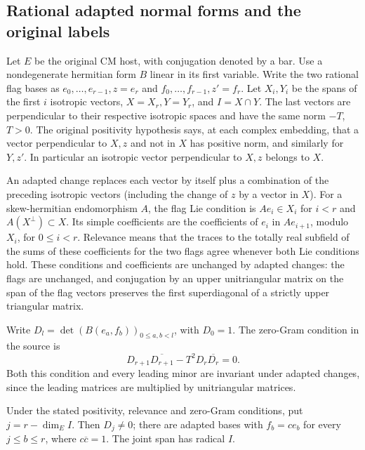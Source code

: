 \subsection{Rational adapted normal forms and the original labels}
\label{sec:flag-adapted-normal-form}

Let \(E\) be the original CM host, with conjugation denoted
by a bar. Use a nondegenerate hermitian form \(B\) linear
in its first variable. Write the two rational flag bases as
\(e_0,\ldots,e_{r-1},z=e_r\) and
\(f_0,\ldots,f_{r-1},z'=f_r\).
Let \(X_i,Y_i\) be the spans of the first \(i\) isotropic
vectors, \(X=X_r,Y=Y_r\), and \(I=X\cap Y\).
The last vectors are perpendicular to their respective
isotropic spaces and have the same norm \(-T\), \(T>0\).
The original positivity hypothesis says, at each complex
embedding, that a vector perpendicular to \(X,z\) and not
in \(X\) has positive norm, and similarly for \(Y,z'\).
In particular an isotropic vector perpendicular to \(X,z\)
belongs to \(X\).

An adapted change replaces each vector by itself plus a
combination of the preceding isotropic vectors (including
the change of \(z\) by a vector in \(X\)).
For a skew-hermitian endomorphism \(A\), the flag Lie
condition is \(Ae_i\in X_i\) for \(i<r\) and
\(A(X^\perp)\subset X\). Its simple coefficients are the
coefficients of \(e_i\) in \(Ae_{i+1}\), modulo \(X_i\),
for \(0\le i<r\). Relevance means that the traces to the
totally real subfield of the sums of these coefficients
for the two flags agree whenever both Lie conditions hold.
These conditions and coefficients are unchanged by adapted
changes: the flags are unchanged, and conjugation by an
upper unitriangular matrix on the span of the flag vectors
preserves the first superdiagonal of a strictly upper
triangular matrix.

Write \(D_l=\det(B(e_a,f_b))_{0\le a,b<l}\), with \(D_0=1\).
The zero-Gram condition in the source is
\[
 D_{r+1}\overline{D_{r+1}}-T^2D_r\overline{D_r}=0.
\]
Both this condition and every leading minor are invariant
under adapted changes, since the leading matrices are
multiplied by unitriangular matrices.

\begin{lemma}
\label{lem:rational-flag-common-tail}
Under the stated positivity, relevance and zero-Gram
conditions, put \(j=r-\dim_E I\). Then \(D_j\ne0\);
there are adapted bases with
\(f_b=c e_b\) for every \(j\le b\le r\), where
\(c\overline c=1\). The joint span has radical \(I\).
\end{lemma}

